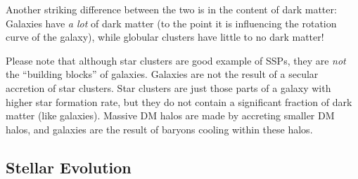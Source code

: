 \par Another striking difference between the two is in the content of dark matter: Galaxies have \emph{a lot} of dark matter (to the point it is influencing the rotation curve of the galaxy), while globular clusters have little to no dark matter!
\par Please note that although star clusters are good example of SSPs, they are \emph{not} the “building blocks” of galaxies. Galaxies are not the result of a secular accretion of star clusters. Star clusters are just those parts of a galaxy with higher star formation rate, but they do not contain a significant fraction of dark matter (like galaxies). Massive DM halos are made by accreting smaller DM halos, and galaxies are the result of baryons cooling within these halos.

\subsection{Stellar Evolution}

